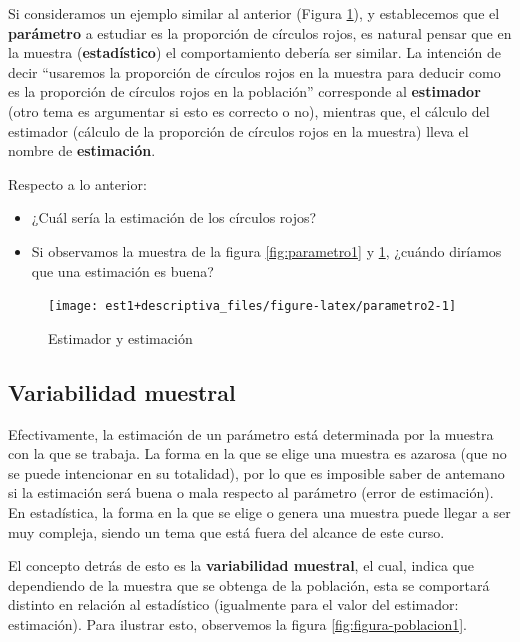 \documentclass[
  11pt,
]{book}
\providecommand{\tightlist}{%
  \setlength{\itemsep}{0pt}\setlength{\parskip}{0pt}}
\theoremstyle{definition}
\theoremstyle{definition}
\theoremstyle{definition}
\theoremstyle{definition}
\theoremstyle{remark}
\begin{document}
Si consideramos un ejemplo similar al anterior (Figura \ref{fig:parametro2}), y establecemos que el \textbf{parámetro} a estudiar es la proporción de círculos rojos, es natural pensar que en la muestra (\textbf{estadístico}) el comportamiento debería ser similar. La intención de decir ``usaremos la proporción de círculos rojos en la muestra para deducir como es la proporción de círculos rojos en la población'' corresponde al \textbf{estimador} (otro tema es argumentar si esto es correcto o no), mientras que, el cálculo del estimador (cálculo de la proporción de círculos rojos en la muestra) lleva el nombre de \textbf{estimación}.

Respecto a lo anterior:

\begin{itemize}
\tightlist
\item
  ¿Cuál sería la estimación de los círculos rojos?
\item
  Si observamos la muestra de la figura \ref{fig:parametro1} y \ref{fig:parametro2}, ¿cuándo diríamos que una estimación es buena?
\end{itemize}

\begin{figure}

{\centering \texttt{[image: est1+descriptiva\_files/figure-latex/parametro2-1]} 

}

\caption{Estimador y estimación}\label{fig:parametro2}
\end{figure}

\subsection{Variabilidad muestral}\label{variabilidad-muestral}

Efectivamente, la estimación de un parámetro está determinada por la muestra con la que se trabaja. La forma en la que se elige una muestra es azarosa (que no se puede intencionar en su totalidad), por lo que es imposible saber de antemano si la estimación será buena o mala respecto al parámetro (error de estimación). En estadística, la forma en la que se elige o genera una muestra puede llegar a ser muy compleja, siendo un tema que está fuera del alcance de este curso.

El concepto detrás de esto es la \textbf{variabilidad muestral}, el cual, indica que dependiendo de la muestra que se obtenga de la población, esta se comportará distinto en relación al estadístico (igualmente para el valor del estimador: estimación). Para ilustrar esto, observemos la figura \ref{fig:figura-poblacion1}.
\end{document}

